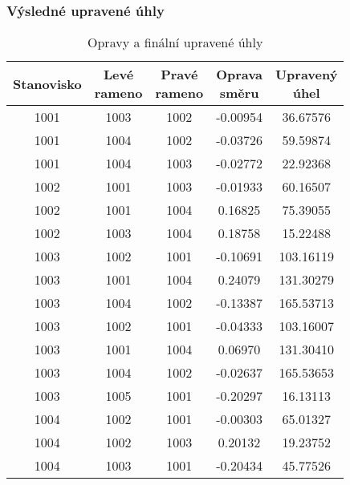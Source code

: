 \subsubsection{Výsledné upravené úhly}
\begin{table}[H]
    \centering
    
    \begin{tabular}{|c|c|c||c|c|}
        \hline
        Stanovisko & \makecell{Levé\\rameno} & \makecell{Pravé\\rameno} & \makecell{Oprava\\směru} & \makecell{Upravený\\úhel} \\
        \hline
        1001 & 1003 & 1002 & -0.00954 & 36.67576 \\
        1001 & 1004 & 1002 & -0.03726 & 59.59874 \\
        1001 & 1004 & 1003 & -0.02772 & 22.92368 \\
        \hline
        1002 & 1001 & 1003 & -0.01933 & 60.16507 \\
        1002 & 1001 & 1004 & 0.16825 & 75.39055 \\
        1002 & 1003 & 1004 & 0.18758 & 15.22488 \\
        \hline
        1003 & 1002 & 1001 & -0.10691 & 103.16119 \\
        1003 & 1001 & 1004 & 0.24079 & 131.30279 \\
        1003 & 1004 & 1002 & -0.13387 & 165.53713 \\
        1003 & 1002 & 1001 & -0.04333 & 103.16007 \\
        1003 & 1001 & 1004 & 0.06970 & 131.30410 \\
        1003 & 1004 & 1002 & -0.02637 & 165.53653 \\
        1003 & 1005 & 1001 & -0.20297 & 16.13113 \\
        \hline
        1004 & 1002 & 1001 & -0.00303 & 65.01327 \\
        1004 & 1002 & 1003 & 0.20132 & 19.23752 \\
        1004 & 1003 & 1001 & -0.20434 & 45.77526 \\
        \hline
    \end{tabular}
    \caption{Opravy a finální upravené úhly}
\end{table}

